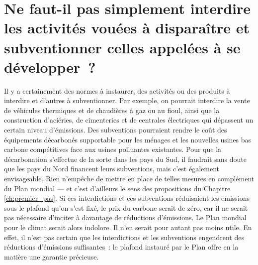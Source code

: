\documentclass[a5paper,french,openany]{memoir}
\begin{document}
\section*{\normalsize Ne faut-il pas simplement %
interdire les activités vouées à disparaître et subventionner celles appelées à se développer~?}\label{q:interdiction}

Il y a certainement des normes à instaurer, des activités ou des produits à interdire et d'autres à subventionner. Par exemple, on pourrait interdire la vente de véhicules thermiques et de chaudières à gaz ou au fioul, ainsi que la construction d'aciéries, de cimenteries et de centrales électriques qui dépassent un certain niveau d'émissions. Des subventions pourraient rendre le coût des équipements décarbonés supportable pour les ménages et les nouvelles usines bas carbone compétitives face aux usines polluantes existantes. Pour que la décarbonation s'effectue de la sorte dans les pays du Sud, il faudrait sans doute que les pays du Nord financent leurs subventions, mais c'est également envisageable. Rien n'empêche de mettre en place de telles mesures en complément du Plan mondial --- et c'est d'ailleurs le sens des propositions du Chapitre \ref{ch:premier_pas}. Si ces interdictions et ces subventions réduisaient les émissions sous le plafond qu'on s'est fixé, le prix du carbone serait de zéro, car il ne serait pas nécessaire d'inciter à davantage de réductions d'émissions. Le Plan mondial pour le climat serait alors indolore. Il n'en serait pour autant pas moins utile. En effet, il n'est pas certain que les interdictions et les subventions engendrent des réductions d'émissions suffisantes~: le plafond instauré par le Plan offre en la matière une garantie précieuse.
\end{document}
